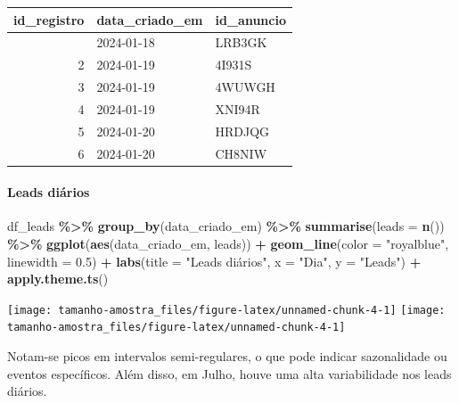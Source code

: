 \documentclass[
]{article}
\newenvironment{Shaded}{\begin{snugshade}}{\end{snugshade}}
\newcommand{\AttributeTok}[1]{\textcolor[rgb]{0.13,0.29,0.53}{#1}}
\newcommand{\FloatTok}[1]{\textcolor[rgb]{0.00,0.00,0.81}{#1}}
\newcommand{\FunctionTok}[1]{\textcolor[rgb]{0.13,0.29,0.53}{\textbf{#1}}}
\newcommand{\NormalTok}[1]{#1}
\newcommand{\SpecialCharTok}[1]{\textcolor[rgb]{0.81,0.36,0.00}{\textbf{#1}}}
\newcommand{\StringTok}[1]{\textcolor[rgb]{0.31,0.60,0.02}{#1}}
\begin{document}
\begin{longtable}[]{@{}rll@{}}
\toprule\noalign{}
id\_registro & data\_criado\_em & id\_anuncio \\
\midrule\noalign{}
\endhead
\bottomrule\noalign{}
\endlastfoot
1 & 2024-01-18 & LRB3GK \\
2 & 2024-01-19 & 4I931S \\
3 & 2024-01-19 & 4WUWGH \\
4 & 2024-01-19 & XNI94R \\
5 & 2024-01-20 & HRDJQG \\
6 & 2024-01-20 & CH8NIW \\
\end{longtable}

\paragraph{Leads diários}\label{leads-diuxe1rios}

\begin{Shaded}
\begin{Highlighting}[]
\NormalTok{df\_leads }\SpecialCharTok{\%\textgreater{}\%}
  \FunctionTok{group\_by}\NormalTok{(data\_criado\_em) }\SpecialCharTok{\%\textgreater{}\%}
  \FunctionTok{summarise}\NormalTok{(}\AttributeTok{leads =} \FunctionTok{n}\NormalTok{()) }\SpecialCharTok{\%\textgreater{}\%}
  \FunctionTok{ggplot}\NormalTok{(}\FunctionTok{aes}\NormalTok{(data\_criado\_em, leads)) }\SpecialCharTok{+}
  \FunctionTok{geom\_line}\NormalTok{(}\AttributeTok{color =} \StringTok{"royalblue"}\NormalTok{, }\AttributeTok{linewidth =} \FloatTok{0.5}\NormalTok{) }\SpecialCharTok{+}
  \FunctionTok{labs}\NormalTok{(}\AttributeTok{title =} \StringTok{"Leads diários"}\NormalTok{,}
       \AttributeTok{x =} \StringTok{"Dia"}\NormalTok{,}
       \AttributeTok{y =} \StringTok{"Leads"}\NormalTok{) }\SpecialCharTok{+}
  \FunctionTok{apply.theme.ts}\NormalTok{()}
\end{Highlighting}
\end{Shaded}

\begin{center}  { \texttt{[image: tamanho-amostra\_files/figure-latex/unnamed-chunk-4-1]} } { \texttt{[image: tamanho-amostra\_files/figure-latex/unnamed-chunk-4-1]} }  \end{center}

Notam-se picos em intervalos semi-regulares, o que pode indicar
sazonalidade ou eventos específicos. Além disso, em Julho, houve uma
alta variabilidade nos leads diários.
\end{document}
